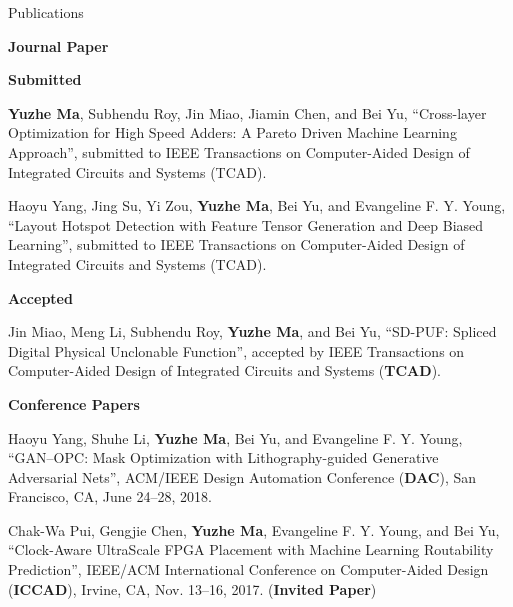 \begin{rSection}{Publications}

\iffalse
\textbf{Books / Book Chapters}
\begin{description}[font=\normalfont]

\end{description}
\fi

\textbf{Journal Paper}
\begin{description}[font=\normalfont]
\item \textbf{Submitted}
\item[{[J]}]{
    \textbf{Yuzhe Ma}, Subhendu Roy, Jin Miao, Jiamin Chen, and Bei Yu,
    ``Cross-layer Optimization for High Speed Adders: A Pareto Driven Machine Learning Approach'', 
    submitted to IEEE Transactions on Computer-Aided Design of Integrated Circuits and Systems (TCAD).
}

\item[{[J]}]{
    Haoyu Yang, Jing Su, Yi Zou, \textbf{Yuzhe Ma}, Bei Yu, and Evangeline F. Y. Young, 
    ``Layout Hotspot Detection with Feature Tensor Generation and Deep Biased Learning'', 
    submitted to IEEE Transactions on Computer-Aided Design of Integrated Circuits and Systems (TCAD).
}

\item \textbf{Accepted}
\item[{[J1]}]{
	Jin Miao, Meng Li, Subhendu Roy, \textbf{Yuzhe Ma}, and Bei Yu, 
	``SD-PUF: Spliced Digital Physical Unclonable Function'', 
	accepted by IEEE Transactions on Computer-Aided Design of Integrated Circuits and Systems (\textbf{TCAD}).
}
\end{description}


\textbf{Conference Papers}
\begin{description}[font=\normalfont]
\item[{[C5]}]{
	Haoyu Yang, Shuhe Li, \textbf{Yuzhe Ma}, Bei Yu, and Evangeline F. Y. Young,
	``GAN--OPC: Mask Optimization with Lithography-guided Generative Adversarial Nets'', 
	ACM/IEEE Design Automation Conference (\textbf{DAC}), San Francisco, CA, June 24--28, 2018.
}

\item[{[C4]}]{
	Chak-Wa Pui, Gengjie Chen, \textbf{Yuzhe Ma}, Evangeline F. Y. Young, and Bei Yu,
	``Clock-Aware UltraScale FPGA Placement with Machine Learning Routability Prediction'', 
	IEEE/ACM International Conference on Computer-Aided Design (\textbf{ICCAD}), Irvine, CA, Nov. 13--16, 2017.
	(\textbf{Invited Paper})
}


\end{description}
\end{rSection}
